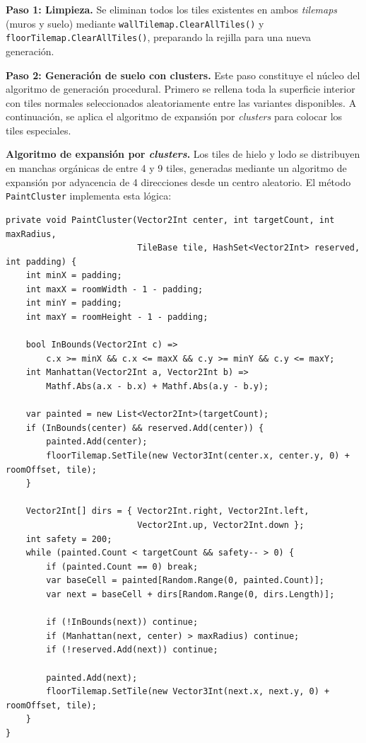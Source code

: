 \textbf{Paso 1: Limpieza.} Se eliminan todos los tiles existentes en ambos \textit{tilemaps} (muros y suelo) mediante \texttt{wallTilemap.ClearAllTiles()} y \texttt{floorTilemap.ClearAllTiles()}, preparando la rejilla para una nueva generación.

\textbf{Paso 2: Generación de suelo con clusters.} Este paso constituye el núcleo del algoritmo de generación procedural. Primero se rellena toda la superficie interior con tiles normales seleccionados aleatoriamente entre las variantes disponibles. A continuación, se aplica el algoritmo de expansión por \textit{clusters} para colocar los tiles especiales.

\textbf{Algoritmo de expansión por \textit{clusters}.} Los tiles de hielo y lodo se distribuyen en manchas orgánicas de entre 4 y 9 tiles, generadas mediante un algoritmo de expansión por adyacencia de 4 direcciones desde un centro aleatorio. El método \texttt{PaintCluster} implementa esta lógica:

\begin{lstlisting}
private void PaintCluster(Vector2Int center, int targetCount, int maxRadius,
                          TileBase tile, HashSet<Vector2Int> reserved, int padding) {
    int minX = padding;
    int maxX = roomWidth - 1 - padding;
    int minY = padding;
    int maxY = roomHeight - 1 - padding;
    
    bool InBounds(Vector2Int c) =>
        c.x >= minX && c.x <= maxX && c.y >= minY && c.y <= maxY;
    int Manhattan(Vector2Int a, Vector2Int b) =>
        Mathf.Abs(a.x - b.x) + Mathf.Abs(a.y - b.y);
    
    var painted = new List<Vector2Int>(targetCount);
    if (InBounds(center) && reserved.Add(center)) {
        painted.Add(center);
        floorTilemap.SetTile(new Vector3Int(center.x, center.y, 0) + roomOffset, tile);
    }
    
    Vector2Int[] dirs = { Vector2Int.right, Vector2Int.left,
                          Vector2Int.up, Vector2Int.down };
    int safety = 200;
    while (painted.Count < targetCount && safety-- > 0) {
        if (painted.Count == 0) break;
        var baseCell = painted[Random.Range(0, painted.Count)];
        var next = baseCell + dirs[Random.Range(0, dirs.Length)];
        
        if (!InBounds(next)) continue;
        if (Manhattan(next, center) > maxRadius) continue;
        if (!reserved.Add(next)) continue;
        
        painted.Add(next);
        floorTilemap.SetTile(new Vector3Int(next.x, next.y, 0) + roomOffset, tile);
    }
}
\end{lstlisting}


